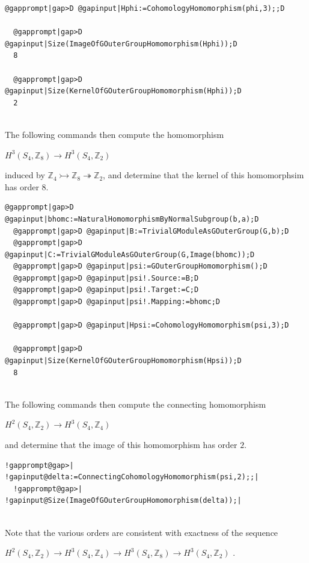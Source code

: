 \documentclass[a4paper,11pt]{report}
\begin{document}
{{\begin{Verbatim}[commandchars=@|D,fontsize=\small,frame=single,label=Example]
  @gapprompt|gap>D @gapinput|Hphi:=CohomologyHomomorphism(phi,3);;D
  
  @gapprompt|gap>D @gapinput|Size(ImageOfGOuterGroupHomomorphism(Hphi));D
  8
  
  @gapprompt|gap>D @gapinput|Size(KernelOfGOuterGroupHomomorphism(Hphi));D
  2
  
\end{Verbatim}
 

 The following commands then compute the homomorphism 

$H^3(S_4,\mathbb Z_8) \rightarrow H^3(S_4,\mathbb Z_2)$ 

induced by $\mathbb Z_4 \rightarrowtail \mathbb Z_8 \twoheadrightarrow \mathbb Z_2$, and determine that the kernel of this homomorphsim has order $8$. 
\begin{Verbatim}[commandchars=@|D,fontsize=\small,frame=single,label=Example]
  @gapprompt|gap>D @gapinput|bhomc:=NaturalHomomorphismByNormalSubgroup(b,a);D
  @gapprompt|gap>D @gapinput|B:=TrivialGModuleAsGOuterGroup(G,b);D
  @gapprompt|gap>D @gapinput|C:=TrivialGModuleAsGOuterGroup(G,Image(bhomc));D
  @gapprompt|gap>D @gapinput|psi:=GOuterGroupHomomorphism();D
  @gapprompt|gap>D @gapinput|psi!.Source:=B;D
  @gapprompt|gap>D @gapinput|psi!.Target:=C;D
  @gapprompt|gap>D @gapinput|psi!.Mapping:=bhomc;D
  
  @gapprompt|gap>D @gapinput|Hpsi:=CohomologyHomomorphism(psi,3);D
  
  @gapprompt|gap>D @gapinput|Size(KernelOfGOuterGroupHomomorphism(Hpsi));D
  8
  
\end{Verbatim}
 

The following commands then compute the connecting homomorphism 

$H^2(S_4,\mathbb Z_2) \rightarrow H^3(S_4,\mathbb Z_4)$ 

and determine that the image of this homomorphism has order $2$. 
\begin{Verbatim}[commandchars=!@|,fontsize=\small,frame=single,label=Example]
  !gapprompt@gap>| !gapinput@delta:=ConnectingCohomologyHomomorphism(psi,2);;|
  !gapprompt@gap>| !gapinput@Size(ImageOfGOuterGroupHomomorphism(delta));|
  
\end{Verbatim}
 Note that the various orders are consistent with exactness of the sequence 

$H^2(S_4,\mathbb Z_2) \rightarrow H^3(S_4,\mathbb Z_4) \rightarrow
H^3(S_4,\mathbb Z_8) \rightarrow H^3(S_4,\mathbb Z_2) $ . }

}
\end{document}
